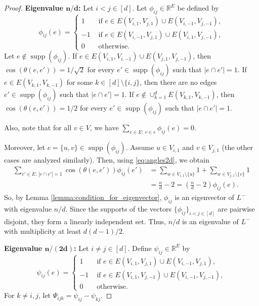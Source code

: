 \documentclass[a4paper,11pt]{article}
\theoremstyle{plain}
\theoremstyle{definition}
\newcommand{\Rea}{{\mathbb R}}
\DeclareMathOperator{\supp}{\text{supp}}
\begin{document}
\begin{proof}
\textbf{Eigenvalue $\bm{n/d}$:}  Let $i< j \in [d]$.
Let $\phi_{ij}\in \Rea^E$ be defined by
\[
\phi_{ij}(e)= \begin{cases}
            1 & \text{ if } e\in E(V_{i,1},V_{j,1})\cup E(V_{i,-1},V_{j,-1}),\\
            -1 & \text{ if } e\in E(V_{i,-1},V_{j,1})\cup E(V_{i,1},V_{j,-1}),\\
            0 & \text{ otherwise}.
\end{cases}
\]
Let $e\notin \supp(\phi_{i j})$. 
If $e\in E(V_{i,1},V_{i,-1})\cup E(V_{j,1},V_{j,-1})$, then $\cos(\theta(e,e'))=1/\sqrt{2}$
for every $e'\in \supp(\phi_{i j})$ such that $|e\cap e'|=1$.
If $e\in E(V_{k,1},V_{k,-1})$ for some $k\in[d]\setminus\{i,j\}$, then there are no edges $e'\in \supp(\phi_{i j})$ such that $|e\cap e'|=1$.
If $e\notin \cup_{k=1}^d E(V_{k,1},V_{k,-1})$, then $\cos(\theta(e,e'))=1/2$
for every $e'\in \supp(\phi_{i j})$ such that $|e\cap e'|=1$.

Also, note that for all $v\in V$, we have $\sum_{e\in E:\, v\in e} \phi_{i j}(e)=0$.

Moreover, let $e=\{u,v\}\in\supp(\phi_{i j})$. Assume $u\in V_{i, 1}$ and $v\in V_{j, 1}$ (the other cases are analyzed similarly). Then, using \eqref{eq:angles2d}, we obtain
\begin{align*}
        \sum_{e'\in E:\, |e\cap e'|=1} \cos(\theta(e,e'))\phi_{ i j}(e') &=\sum_{w\in V_{i,1}\setminus\{u\}} 1 + \sum_{w\in V_{j,1}\setminus\{v\}} 1 
      \\
      &= \frac{n}{d}-2 
      = \left(\frac{n}{d}-2\right)\phi_{i j}(e).
\end{align*}
So, by Lemma \ref{lemma:condition_for_eigenvector}, $\phi_{ij}$ is an eigenvector of $L^{-}$ with eigenvalue $n/d$.
Since the supports of the vectors $\{\phi_{ij}\}_{i<j\in[d]}$ are pairwise disjoint, they form a linearly independent set. Thus, $n/d$ is an eigenvalue of $L^{-}$ with multiplicity at least $d(d-1)/2$.


\textbf{Eigenvalue $\bm{n/(2d)}$:} 
Let $i\neq j\in[d]$. Define $\psi_{i j}\in \Rea^E$ by
\[
    \psi_{ij}(e)= \begin{cases}
        1 & \text{ if } e\in E(V_{i,1},V_{j,1})\cup E(V_{i,-1},V_{j,1}),\\
        -1 & \text{ if } e\in E(V_{i,1},V_{j,-1})\cup E(V_{i,-1},V_{j,-1}),\\
        0 & \text{ otherwise.}
    \end{cases}
\]
For $k\neq i,j$, let $   \Psi_{i j k}= \psi_{i j}-\psi_{k j}$.



\end{proof}
\end{document}
